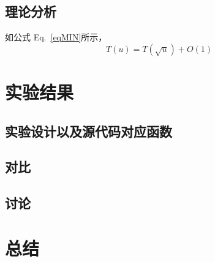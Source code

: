 \documentclass[10pt,journal,compsoc]{IEEEtran}
\begin{document}
\subsection{理论分析}

\indent 如公式 Eq.~\ref{eqMIN}所示， \\

\begin{equation} T(u)=T(\sqrt{u})+O(1)
\label{eqMIN} 
\end{equation}





\section{实验结果}



\subsection{实验设计以及源代码对应函数}



\subsection{对比}


\subsection{讨论} 



\section{总结}









\end{document}
